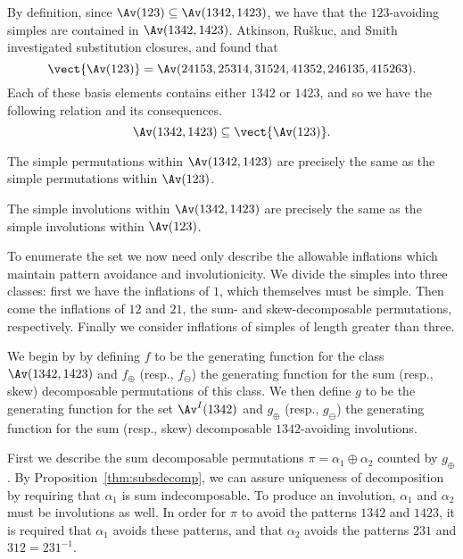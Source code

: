 \documentclass[12pt,twoside]{memoir}
\begin{document}
      By definition, since $\Av(123) \subseteq \Av(1342, 1423)$, we have that
      the $123$-avoiding simples are contained in $\Av(1342, 1423)$.
      Atkinson, Ru\v{s}kuc, and Smith~\cite{Atkinson2011} investigated
      substitution closures, and found that 
      $$ \vect{\Av(123)} = \Av(24153, 25314, 31524, 41352, 246135, 415263).$$
      Each of these basis elements contains either $1342$ or $1423$, and so we
      have the following relation and its consequences. 
      $$ \Av(1342, 1423) \subseteq \vect{\Av(123)}.$$ 

      \begin{proposition} \label{involutions:prop:1342simpleperms}
        The simple permutations within $\Av(1342, 1423)$ are precisely the same
        as the simple permutations within $\Av(123)$. 
      \end{proposition}

      \begin{corollary} \label{involutions:cor:1342simple}
        The simple involutions within $\Av(1342, 1423)$ are precisely the same
        as the simple involutions within $\Av(123)$. 
      \end{corollary}

      To enumerate the set we now need only describe the allowable inflations
      which maintain pattern avoidance and involutionicity. We divide the simples
      into three classes: first we have the inflations of $1$, which themselves
      must be simple. Then come the inflations of $12$ and $21$, the sum- and
      skew-decomposable permutations, respectively. Finally we consider
      inflations of simples of length greater than three. 



      We begin by by defining $f$ to be the generating function for the class
      $\Av(1342,1423)$ and $f_\oplus$ (resp., $f_\ominus$) the generating
      function for the sum (resp., skew) decomposable permutations of this class.
      We then define $g$ to be the generating function for the set $\Av^I(1342)$
      and $g_\oplus$ (resp., $g_\ominus$) the generating function for the sum
      (resp., skew) decomposable $1342$-avoiding involutions.

      
      First we describe the sum decomposable permutations
      $\pi=\alpha_1\oplus\alpha_2$ counted by $g_\oplus$. By
      Proposition~\ref{thm:subsdecomp}, we can assure uniqueness of
      decomposition by requiring that $\alpha_1$ is sum indecomposable. To produce
      an involution, $\alpha_1$ and $\alpha_2$ must be involutions as well. In
      order for $\pi$ to avoid the patterns $1342$ and $1423$, it is required that
      $\alpha_1$ avoids these patterns, and that $\alpha_2$ avoids the patterns
      $231$ and $312=231^{-1}$.
\end{document}
